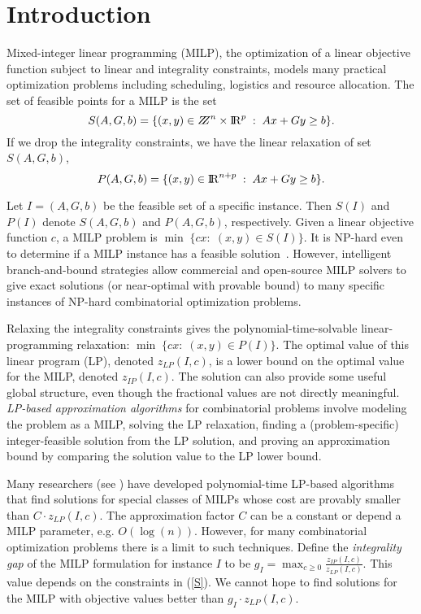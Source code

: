 \section{Introduction}

Mixed-integer linear programming (MILP), the optimization of a linear objective function subject to linear and integrality constraints, models many practical optimization problems including scheduling, logistics and resource allocation.  The set of feasible points for a MILP is the set
\begin{equation}
S(A,G,b)= \{(x,y)\in \bbbz^{n}\times \bbbr^p\;:\; Ax+Gy\geq b\}  \label{S}.
\end{equation}
If we drop the integrality constraints, we have the linear relaxation of set $S(A,G,b)$,
\begin{equation}
P(A,G,b) = \{(x,y)\in {\rm I\!R}^{n+ p}\;:\; Ax+Gy\geq b\}. \label{P}
\end{equation}

Let $I=(A,G,b)$ be the feasible set of a specific instance. Then $S(I)$ and $P(I)$ denote $S(A,G,b)$ and $P(A,G,b)$, respectively. Given a linear objective function $c$, a MILP problem is $\min \;\{cx:\; (x,y) \in S(I)\}$. It is  NP-hard even to determine if a MILP instance has a feasible solution~\cite{GJ79}. However, intelligent branch-and-bound strategies allow commercial and open-source MILP solvers to give exact solutions (or near-optimal with provable bound) to many specific instances of NP-hard combinatorial optimization problems. 

Relaxing the integrality constraints gives the polynomial-time-solvable linear-programming relaxation: $\min \;\{cx:\;(x,y)\in P(I) \}$.  The optimal value of this linear program (LP), denoted $z_{LP}(I,c)$, is a lower bound on the optimal value for the MILP, denoted $z_{IP}(I,c)$. The solution can also provide some useful global structure, even though the fractional values are not directly meaningful. {\em LP-based approximation algorithms} for combinatorial problems involve modeling the problem as a MILP, solving the LP relaxation, finding a (problem-specific) integer-feasible solution from the LP solution, and proving an approximation bound by comparing the solution value to the LP lower bound.

Many researchers (see \cite{vazirani,sw}) have developed polynomial-time LP-based algorithms that find solutions for special classes of MILPs whose cost are provably smaller than $C\cdot z_{LP}(I,c)$. The approximation factor $C$ can be a constant or depend a MILP parameter, e.g. $O(\log(n))$. However, for many combinatorial optimization problems there is a limit to such techniques. Define the \textit{integrality gap} of the MILP formulation for instance $I$ to be $g_I= \max_{c\geq 0}\frac{z_{IP}(I,c)}{z_{LP}(I,c)}$. This value depends on the constraints in (\ref{S}).  We cannot hope to find solutions for the MILP with objective values better than $g_I\cdot z_{LP}(I,c)$. 

